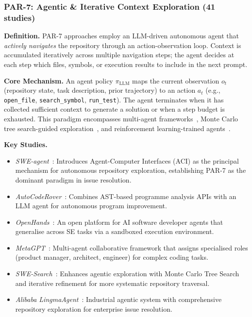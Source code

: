 \documentclass[acmsmall,screen,review]{acmart}
\begin{document}
\subsubsection{PAR-7: Agentic \& Iterative Context Exploration
  (41 studies)}
\label{subsubsec:par7}

\textbf{Definition.} PAR-7 approaches employ an LLM-driven autonomous
agent that \emph{actively navigates} the repository through an
action-observation loop. Context is accumulated iteratively across
multiple navigation steps; the agent decides at each step which files,
symbols, or execution results to include in the next prompt.

\textbf{Core Mechanism.} An agent policy $\pi_{\text{LLM}}$ maps the
current observation $o_t$ (repository state, task description, prior
trajectory) to an action $a_t$ (e.g., \texttt{open\_file},
\texttt{search\_symbol}, \texttt{run\_test}). The agent terminates when
it has collected sufficient context to generate a solution or when a
step budget is exhausted. This paradigm encompasses multi-agent
frameworks~\cite{Hong2023MetaGPT, Li2025SWEDebate}, Monte Carlo
tree search-guided exploration~\cite{Antoniades2024SWESearch}, and
reinforcement learning-trained
agents~\cite{Pan2025SWEGym, Wei2025SWERL}.

\textbf{Key Studies.}
\begin{itemize}
  \item \textit{SWE-agent}~\cite{Yang2024SWEAgent}: Introduces
    Agent-Computer Interfaces (ACI) as the principal mechanism for
    autonomous repository exploration, establishing PAR-7 as the
    dominant paradigm in issue resolution.
  \item \textit{AutoCodeRover}~\cite{Zhang2024ACR}: Combines AST-based
    programme analysis APIs with an LLM agent for autonomous program
    improvement.
  \item \textit{OpenHands}~\cite{Wang2025OpenHands}: An open platform
    for AI software developer agents that generalise across SE tasks via
    a sandboxed execution environment.
  \item \textit{MetaGPT}~\cite{Hong2023MetaGPT}: Multi-agent
    collaborative framework that assigns specialised roles (product
    manager, architect, engineer) for complex coding tasks.
  \item \textit{SWE-Search}~\cite{Antoniades2024SWESearch}: Enhances
    agentic exploration with Monte Carlo Tree Search and iterative
    refinement for more systematic repository traversal.
  \item \textit{Alibaba LingmaAgent}~\cite{Ma2025Lingma}: Industrial
    agentic system with comprehensive repository exploration for
    enterprise issue resolution.
\end{itemize}
\end{document}
